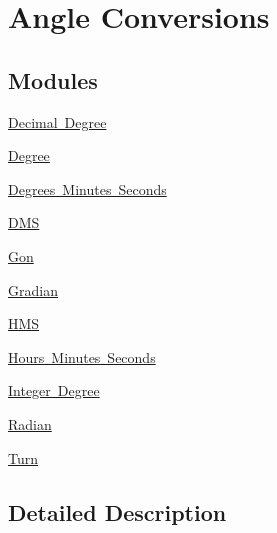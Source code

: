 \hypertarget{group___e_g_x_math-_conversions-_angle_conversions}{}\section{Angle Conversions}
\label{group___e_g_x_math-_conversions-_angle_conversions}
\subsection*{Modules}
\begin{DoxyCompactItemize}
\item 
\mbox{\hyperlink{group___e_g_x_math-_conversions-_angle_conversions-_decimal_degree}{Decimal Degree}}
\item 
\mbox{\hyperlink{group___e_g_x_math-_conversions-_angle_conversions-_degree}{Degree}}
\item 
\mbox{\hyperlink{group___e_g_x_math-_conversions-_angle_conversions-_degrees_minutes_seconds}{Degrees Minutes Seconds}}
\item 
\mbox{\hyperlink{group___e_g_x_math-_conversions-_angle_conversions-_d_m_s}{D\+MS}}
\item 
\mbox{\hyperlink{group___e_g_x_math-_conversions-_angle_conversions-_gon}{Gon}}
\item 
\mbox{\hyperlink{group___e_g_x_math-_conversions-_angle_conversions-_gradian}{Gradian}}
\item 
\mbox{\hyperlink{group___e_g_x_math-_conversions-_angle_conversions-_h_m_s}{H\+MS}}
\item 
\mbox{\hyperlink{group___e_g_x_math-_conversions-_angle_conversions-_hours_minutes_seconds}{Hours Minutes Seconds}}
\item 
\mbox{\hyperlink{group___e_g_x_math-_conversions-_angle_conversions-_integer_degree}{Integer Degree}}
\item 
\mbox{\hyperlink{group___e_g_x_math-_conversions-_angle_conversions-_radian}{Radian}}
\item 
\mbox{\hyperlink{group___e_g_x_math-_conversions-_angle_conversions-_turn}{Turn}}
\end{DoxyCompactItemize}


\subsection{Detailed Description}
